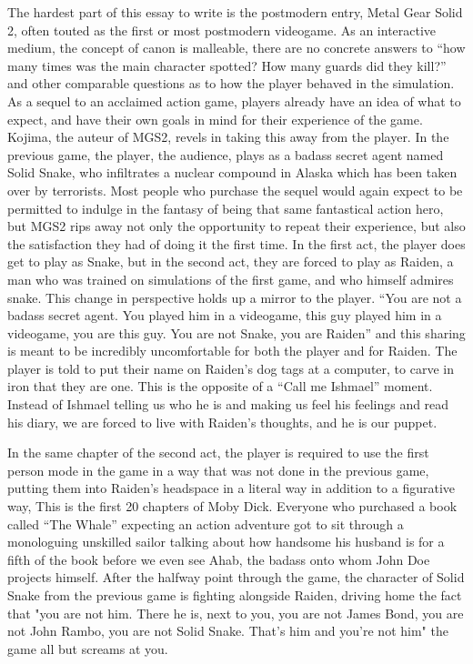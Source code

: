\documentclass[
]{article}
\begin{document}
The hardest part of this essay to write is the postmodern entry, Metal
Gear Solid 2, often touted as the first or most postmodern videogame. As
an interactive medium, the concept of canon is malleable, there are no
concrete answers to ``how many times was the main character spotted? How
many guards did they kill?'' and other comparable questions as to how
the player behaved in the simulation. As a sequel to an acclaimed action
game, players already have an idea of what to expect, and have their own
goals in mind for their experience of the game. Kojima, the auteur of
MGS2, revels in taking this away from the player. In the previous game,
the player, the audience, plays as a badass secret agent named Solid
Snake, who infiltrates a nuclear compound in Alaska which has been taken
over by terrorists. Most people who purchase the sequel would again
expect to be permitted to indulge in the fantasy of being that same
fantastical action hero, but MGS2 rips away not only the opportunity to
repeat their experience, but also the satisfaction they had of doing it
the first time. In the first act, the player does get to play as Snake,
but in the second act, they are forced to play as Raiden, a man who was
trained on simulations of the first game, and who himself admires snake.
This change in perspective holds up a mirror to the player. ``You are
not a badass secret agent. You played him in a videogame, this guy
played him in a videogame, you are this guy. You are not Snake, you are
Raiden'' and this sharing is meant to be incredibly uncomfortable for
both the player and for Raiden. The player is told to put their name on
Raiden's dog tags at a computer, to carve in iron that they are one.
This is the opposite of a ``Call me Ishmael'' moment. Instead of Ishmael
telling us who he is and making us feel his feelings and read his diary,
we are forced to live with Raiden's thoughts, and he is our puppet.

In the same chapter of the second act, the player is required to use the
first person mode in the game in a way that was not done in the previous
game, putting them into Raiden's headspace in a literal way in addition
to a figurative way, This is the first 20 chapters of Moby Dick.
Everyone who purchased a book called ``The Whale'' expecting an action
adventure got to sit through a monologuing unskilled sailor talking
about how handsome his husband is for a fifth of the book before we even
see Ahab, the badass onto whom John Doe projects himself. After the
halfway point through the game, the character of Solid Snake from the
previous game is fighting alongside Raiden, driving home the fact that
"you are not him. There he is, next to you, you are not James Bond, you
are not John Rambo, you are not Solid Snake. That's him and you're not
him" the game all but screams at you.
\end{document}
